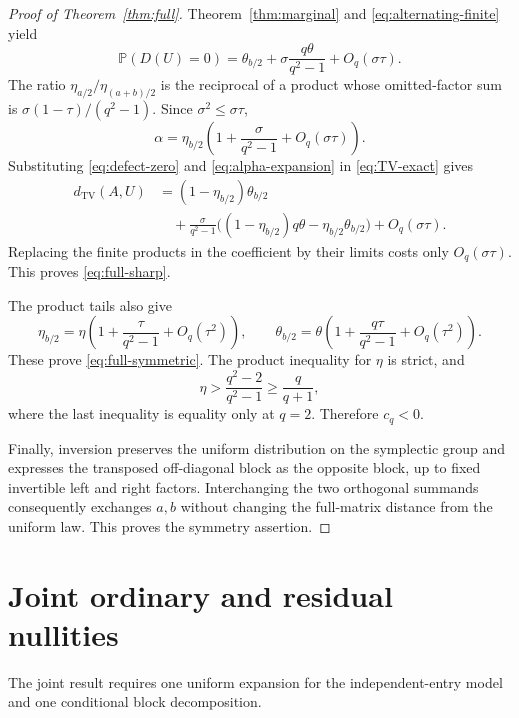 \documentclass[11pt]{article}
\theoremstyle{definition}
\theoremstyle{remark}
\newcommand{\Pp}{\mathbb P}
\newcommand{\TV}{d_{\mathrm{TV}}}
\begin{document}
\begin{proof}[Proof of Theorem~\ref{thm:full}]
Theorem~\ref{thm:marginal} and \eqref{eq:alternating-finite} yield
\begin{equation}\label{eq:defect-zero}
 \Pp(D(U)=0)=\theta_{b/2}
       +\sigma\frac{q\theta}{q^2-1}+O_q(\sigma\tau).
\end{equation}
The ratio $\eta_{a/2}/\eta_{(a+b)/2}$ is the reciprocal of a product whose omitted-factor sum is $\sigma(1-\tau)/(q^2-1)$. Since $\sigma^2\le\sigma\tau$,
\begin{equation}\label{eq:alpha-expansion}
 \alpha=\eta_{b/2}\left(1+\frac{\sigma}{q^2-1}
                   +O_q(\sigma\tau)\right).
\end{equation}
Substituting \eqref{eq:defect-zero} and \eqref{eq:alpha-expansion} in \eqref{eq:TV-exact} gives
\begin{align*}
 \TV(A,U)
 &=(1-\eta_{b/2})\theta_{b/2}\\
 &\quad+\frac{\sigma}{q^2-1}
  \bigl((1-\eta_{b/2})q\theta-\eta_{b/2}\theta_{b/2}\bigr)
  +O_q(\sigma\tau).
\end{align*}
Replacing the finite products in the coefficient by their limits costs only $O_q(\sigma\tau)$. This proves \eqref{eq:full-sharp}.

The product tails also give
\[
 \eta_{b/2}=\eta\left(1+\frac{\tau}{q^2-1}+O_q(\tau^2)\right),\qquad
 \theta_{b/2}=\theta\left(1+\frac{q\tau}{q^2-1}+O_q(\tau^2)\right).
\]
These prove \eqref{eq:full-symmetric}. The product inequality for $\eta$ is strict, and
\[
 \eta>\frac{q^2-2}{q^2-1}\ge\frac{q}{q+1},
\]
where the last inequality is equality only at $q=2$. Therefore $c_q<0$.

Finally, inversion preserves the uniform distribution on the symplectic group and expresses the transposed off-diagonal block as the opposite block, up to fixed invertible left and right factors. Interchanging the two orthogonal summands consequently exchanges $a,b$ without changing the full-matrix distance from the uniform law. This proves the symmetry assertion.
\end{proof}

\section{Joint ordinary and residual nullities}\label{sec:joint}

The joint result requires one uniform expansion for the independent-entry model and one conditional block decomposition.
\end{document}
